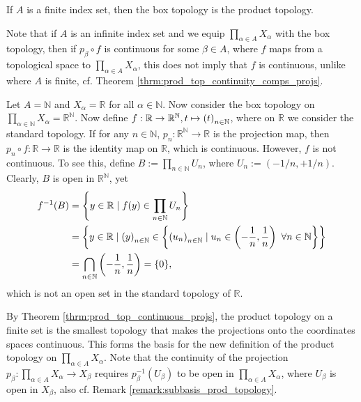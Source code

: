 \begin{remark}
	If $A$ is a finite index set, then the box topology is the product topology.
\end{remark}

\begin{remark}
	Note that if $A$ is an infinite index set and we equip $\prod_{\alpha\in A}X_{\alpha}$ with the box topology, then if $p_{\beta}\circ f$ is continuous for some $\beta\in A$, where $f$ maps from a topological space to $\prod_{\alpha\in A}X_{\alpha}$, this does not imply that $f$ is continuous, unlike where $A$ is finite, cf. Theorem \ref{thrm:prod_top_continuity_comps_projs}.
\end{remark}

\begin{exmp}
	Let $A = \mathbb N$ and $X_{\alpha} = \mathbb R$ for all $\alpha\in\mathbb N$. Now consider the box topology on $\prod_{\alpha\in\mathbb N}X_{\alpha} = \mathbb R^{\mathbb N}$. Now define $f: \mathbb R\to \mathbb R^{\mathbb N}, t\mapsto \seq[t]$, where on $\mathbb R$ we consider the standard topology. If for any $n\in\mathbb N$, $p_n: \mathbb R^{\mathbb N}\to \mathbb R$ is the projection map, then $p_n\circ f: \mathbb R\to\mathbb R$ is the identity map on $\mathbb R$, which is continuous. However, $f$ is not continuous. To see this, define $B := \prod_{n\in\mathbb N}U_n$, where $U_n := (-1/n, +1/n)$. Clearly, $B$ is open in $\mathbb R^{\mathbb N}$, yet 
	\begin{align*}
		f^{-1}(B) &= \left\{y\in\mathbb R\mid f(y)\in \prod_{n\in\mathbb N}U_n\right\} 
		\\ &= \left\{ y\in\mathbb R\mid \seq[y]\in \left\{\seq[u_n]\mid u_n\in \left(-\frac{1}{n}, \frac{1}{n}\right)\ \forall n\in\mathbb N\right\} \right\} 
		\\ &= \bigcap_{n\in\mathbb N}\left(-\frac{1}{n}, \frac{1}{n}\right) = \{0\},
	\end{align*} which is not an open set in the standard topology of $\mathbb R$.
\end{exmp}

\begin{remark}
	By Theorem \ref{thrm:prod_top_continuous_projs}, the product topology on a finite set is the smallest topology that makes the projections onto the coordinates spaces continuous. This forms the basis for the new definition of the product topology on $\prod_{\alpha\in A}X_{\alpha}$. Note that the continuity of the projection $p_{\beta}: \prod_{\alpha\in A}X_{\alpha}\to X_{\beta}$ requires $p_{\beta}^{-1}(U_{\beta})$ to be open in $\prod_{\alpha\in A}X_{\alpha}$, where $U_{\beta}$ is open in $X_{\beta}$, also cf. Remark \ref{remark:subbasis_prod_topology}.
\end{remark}

